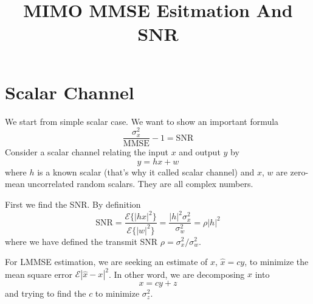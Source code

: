 \documentclass[12pt]{article}
\title{MIMO MMSE Esitmation And SNR}
\theoremstyle{definition}
\begin{document}
	\maketitle

\section{Scalar Channel}
We start from simple scalar case. We want to show an important formula
\begin{equation}
	\frac{\sigma_x^2}{\mbox{MMSE}}-1=\mbox{SNR}\label{MMSEvsSNR scalar}
\end{equation}
Consider a scalar channel relating the input $x$ and output $y$ by
$$
y = hx+w
$$
where $h$ is a known scalar (that's why it called scalar channel) and $x$, $w$ are zero-mean uncorrelated random scalars. They are all complex numbers.

First we find the SNR. By definition
\begin{equation}
	\mbox{SNR} = \frac{\mathcal{E}\{|hx|^2\}}{\mathcal{E}\{|w|^2\}} = \frac{|h|^2\sigma_x^2}{\sigma_w^2} = \rho|h|^2
	\label{SNR = rhoh^2}
\end{equation}
where we have defined the transmit SNR $\rho = \sigma_x^2/\sigma_w^2$.

For LMMSE estimation, we are seeking an estimate of $x$, $\hat{x}=cy$, to minimize the mean square error $\mathcal{E}|\hat{x}-x|^2$. In other word, we are decomposing $x$ into
\begin{equation}
	x = cy+z\label{x = cy+z}
\end{equation}
and trying to find the $c$ to minimize $\sigma_z^2$.
\end{document}
